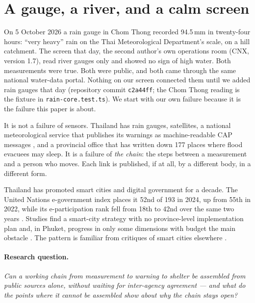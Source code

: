 \documentclass[10pt,twocolumn,a4paper]{article}
\begin{document}
\section{A gauge, a river, and a calm screen}
On 5 October 2026 a rain gauge in Chom Thong recorded 94.5\,mm in twenty-four hours: ``very heavy'' rain on the Thai Meteorological Department's scale, on a hill catchment. The screen that day, the second author's own operations room (CNX, version 1.7), read river gauges only and showed no sign of high water. Both measurements were true. Both were public, and both came through the same national water-data portal. Nothing on our screen connected them until we added rain gauges that day (repository commit \texttt{c2a44ff}; the Chom Thong reading is the fixture in \texttt{rain-core.test.ts}). We start with our own failure because it is the failure this paper is about.

It is not a failure of sensors. Thailand has rain gauges, satellites, a national meteorological service that publishes its warnings as machine-readable CAP messages \citep{tmd2026cap}, and a provincial office that has written down 177 places where flood evacuees may sleep. It is a failure of \emph{the chain}: the steps between a measurement and a person who moves. Each link is published, if at all, by a different body, in a different form.

Thailand has promoted smart cities and digital government for a decade. The United Nations e-government index places it 52nd of 193 in 2024, up from 55th in 2022, while its e-participation rank fell from 18th to 42nd over the same two years \citep{undesa2024egov}. Studies find a smart-city strategy with no province-level implementation plan \citep{naprathansuk2017} and, in Phuket, progress in only some dimensions with budget the main obstacle \citep{jamnong2022phuket}. The pattern is familiar from critiques of smart cities elsewhere \citep{hollands2008,soderstrom2014,shelton2015}.

\paragraph{Research question.} \emph{Can a working chain from measurement to warning to shelter be assembled from public sources alone, without waiting for inter-agency agreement --- and what do the points where it cannot be assembled show about why the chain stays open?}
\end{document}
